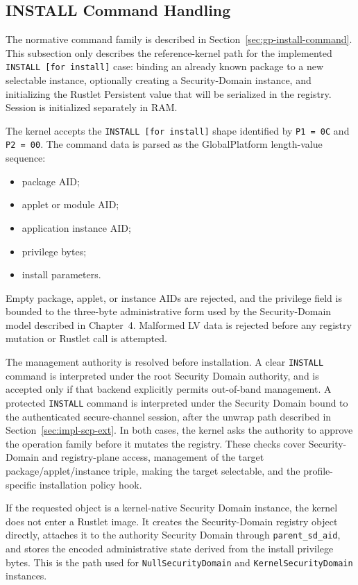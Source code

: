 \subsection{INSTALL Command Handling}
\label{sec:impl-install}

The normative command family is described in
Section~\ref{sec:gp-install-command}. This subsection only describes the
reference-kernel path for the implemented \texttt{INSTALL [for install]} case:
binding an already known package to a new selectable instance, optionally
creating a Security-Domain instance, and initializing the Rustlet Persistent value that
will be serialized in the registry. Session is initialized separately in RAM.

The kernel accepts the \texttt{INSTALL [for install]} shape identified by
\texttt{P1 = 0C} and \texttt{P2 = 00}. The command data is parsed as the
GlobalPlatform length-value sequence:
\begin{itemize}
\item package AID;
\item applet or module AID;
\item application instance AID;
\item privilege bytes;
\item install parameters.
\end{itemize}

Empty package, applet, or instance AIDs are rejected, and the privilege field
is bounded to the three-byte administrative form used by the Security-Domain
model described in Chapter~4. Malformed LV data is rejected before any registry
mutation or Rustlet call is attempted.

The management authority is resolved before installation. A clear
\texttt{INSTALL} command is interpreted under the root Security Domain
authority, and is accepted only if that backend explicitly permits out-of-band
management. A protected \texttt{INSTALL} command is interpreted under the
Security Domain bound to the authenticated secure-channel session, after the
unwrap path described in Section~\ref{sec:impl-scp-ext}. In both cases, the
kernel asks the authority to approve the operation family before it mutates the
registry. These checks cover Security-Domain and registry-plane access,
management of the target package/applet/instance triple, making the target
selectable, and the profile-specific installation policy hook.

If the requested object is a kernel-native Security Domain instance, the
kernel does not enter a Rustlet image. It creates the Security-Domain registry
object directly, attaches it to the authority Security Domain through
\texttt{parent\_sd\_aid}, and stores the encoded administrative state derived
from the install privilege bytes. This is the path used for
\texttt{NullSecurityDomain} and \texttt{KernelSecurityDomain} instances.

